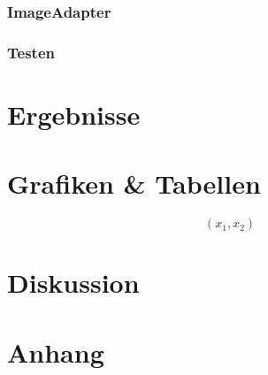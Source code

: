 \documentclass[paper=A4,pagesize=auto,12pt,headinclude=true,footinclude=true,BCOR=0mm,DIV=calc]{scrartcl}
\begin{document}
\subsubsection{ImageAdapter} %

\subsubsection{Testen} %


\section{Ergebnisse}


\section{Grafiken \& Tabellen}
\begin{equation}
	(x_1, x_2)
\end{equation}

\section{Diskussion}


\printbibliography[heading=bibnumbered]


\section{Anhang}
\end{document}
